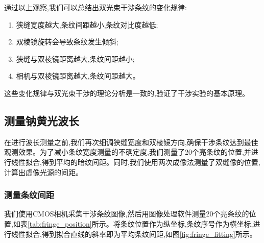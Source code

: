 \documentclass[UTF8]{ctexart}
\begin{document}
通过以上观察,我们可以总结出双光束干涉条纹的变化规律:
\begin{enumerate}
\item 狭缝宽度越大,条纹间距越小,条纹对比度越低;
\item 双棱镜旋转会导致条纹发生倾斜;
\item 狭缝与双棱镜距离越大,条纹间距越小;
\item 相机与双棱镜距离越大,条纹间距越大。
\end{enumerate}

这些变化规律与双光束干涉的理论分析是一致的,验证了干涉实验的基本原理。

\subsection{测量钠黄光波长}

在进行波长测量之前,我们再次细调狭缝宽度和双棱镜方向,确保干涉条纹达到最佳观测效果。为了减小条纹宽度测量的不确定度,我们测量了20个亮条纹的位置,并进行线性拟合,得到平均的暗纹间距。同时,我们使用两次成像法测量了双缝像的位置,计算出虚像光源的间距。

\subsubsection{测量条纹间距}

我们使用CMOS相机采集干涉条纹图像,然后用图像处理软件测量20个亮条纹的位置,如表\ref{tab:fringe_position}所示。将条纹位置作为纵坐标,条纹序号作为横坐标,进行线性拟合,得到拟合直线的斜率即为平均条纹间距,如图\ref{fig:fringe_fitting}所示。
\end{document}
